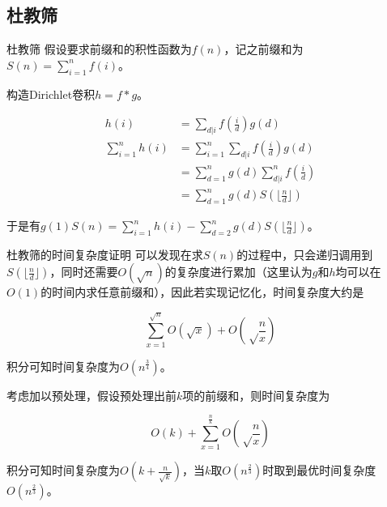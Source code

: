 \documentclass{beamer}
\begin{document}
	\subsection{杜教筛}
	\begin{frame}{杜教筛}
		假设要求前缀和的积性函数为$f(n)$，记之前缀和为$S(n)=\sum_{i=1}^nf(i)$。
		
		构造Dirichlet卷积$h = f * g$。
		
		$$
		\begin{aligned}
		h(i)&=\sum_{d|i}f(\frac{i}{d})g(d)\\
		\sum_{i=1}^nh(i)&=\sum_{i=1}^n\sum_{d|i}f(\frac{i}{d})g(d)\\
		&=\sum_{d=1}^ng(d)\sum_{d|i}^nf(\frac{i}{d})\\
		&=\sum_{d=1}^ng(d)S(\lfloor\frac{n}{d}\rfloor)
		\end{aligned}
		$$
		
		于是有$g(1)S(n)=\sum_{i=1}^nh(i)-\sum_{d=2}^ng(d)S(\lfloor\frac{n}{d}\rfloor)$。
	\end{frame}
	\begin{frame}{杜教筛的时间复杂度证明}
		可以发现在求$S(n)$的过程中，只会递归调用到$S(\lfloor\frac{n}{d}\rfloor)$，同时还需要$O(\sqrt n)$的复杂度进行累加（这里认为$g$和$h$均可以在$O(1)$的时间内求任意前缀和），因此若实现记忆化，时间复杂度大约是
		
		$$\sum_{x=1}^{\sqrt n}O(\sqrt x)+O(\sqrt \frac nx)$$
		
		积分可知时间复杂度为$O(n^{\frac 34})$。
		
		考虑加以预处理，假设预处理出前$k$项的前缀和，则时间复杂度为
		
		$$O(k)+\sum_{x=1}^{\frac nk}O(\sqrt \frac nx)$$
		
		积分可知时间复杂度为$O(k+\frac{n}{\sqrt k})$，当$k$取$O(n^{\frac 23})$时取到最优时间复杂度$O(n^{\frac 23})$。
	\end{frame}
\end{document}
